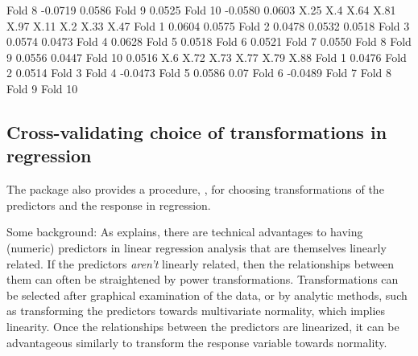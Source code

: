 \documentclass[
]{jss}
\begin{document}
\begin{CodeChunk}
\begin{CodeOutput}
Fold 8  -0.0719                                          0.0586                
Fold 9                   0.0525                                                
Fold 10 -0.0580                                  0.0603                        
           X.25     X.4    X.64    X.81    X.97    X.11     X.2    X.33    X.47
Fold 1                                   0.0604          0.0575                
Fold 2   0.0478          0.0532  0.0518                                        
Fold 3                           0.0574                          0.0473        
Fold 4                   0.0628                                                
Fold 5   0.0518                                                                
Fold 6                                           0.0521                        
Fold 7           0.0550                                                        
Fold 8                                                                         
Fold 9                                   0.0556                          0.0447
Fold 10          0.0516                                                        
            X.6    X.72    X.73    X.77    X.79 X.88
Fold 1   0.0476                                     
Fold 2                   0.0514                     
Fold 3                                              
Fold 4                                  -0.0473     
Fold 5           0.0586                         0.07
Fold 6                          -0.0489             
Fold 7                                              
Fold 8                                              
Fold 9                                              
Fold 10                                             
\end{CodeOutput}
\end{CodeChunk}

\hypertarget{cross-validating-choice-of-transformations-in-regression}{%
\subsection{Cross-validating choice of transformations in
regression}\label{cross-validating-choice-of-transformations-in-regression}}

The  package also provides a  procedure,
, for choosing transformations of the predictors and
the response in regression.

Some background: As \citet[Sec. 8.2]{Weisberg:2014} explains, there are
technical advantages to having (numeric) predictors in linear regression
analysis that are themselves linearly related. If the predictors
\emph{aren't} linearly related, then the relationships between them can
often be straightened by power transformations. Transformations can be
selected after graphical examination of the data, or by analytic
methods, such as transforming the predictors towards multivariate
normality, which implies linearity. Once the relationships between the
predictors are linearized, it can be advantageous similarly to transform
the response variable towards normality.
\end{document}
